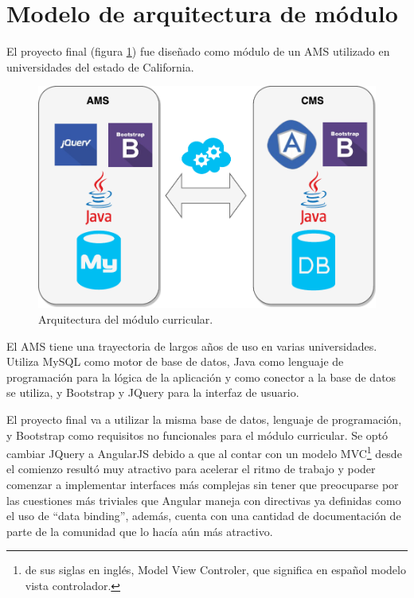 \section{Modelo de arquitectura de módulo}

El proyecto final (figura \ref{arquitectura}) fue diseñado como módulo de un AMS utilizado en universidades del estado de California.

\begin{figure}[H]
\centering
\includegraphics[scale=0.6]{Capitulos/PropuestadeSolucion/Imagenes/arquitectura}
\caption{Arquitectura del módulo curricular.}
  \label{arquitectura}
\end{figure}

El AMS tiene una trayectoria de largos años de uso en varias universidades. Utiliza MySQL como motor de base de datos, Java como lenguaje de programación para la lógica de la aplicación y como conector a la base de datos se utiliza, y Bootstrap y JQuery para la interfaz de usuario. 

El proyecto final va a utilizar la misma base de datos, lenguaje de programación, y Bootstrap como requisitos no funcionales para el módulo curricular. Se optó cambiar JQuery a AngularJS debido a que al contar con un modelo MVC\footnote{de sus siglas en inglés, Model View Controler, que significa en español modelo vista controlador.} desde el comienzo resultó muy atractivo para acelerar el ritmo de trabajo y poder comenzar a implementar interfaces más complejas sin tener que preocuparse por las cuestiones más triviales que Angular maneja con directivas ya definidas como el uso de \enquote{data binding}, además, cuenta con una cantidad de documentación de parte de la comunidad que lo hacía aún más atractivo.
